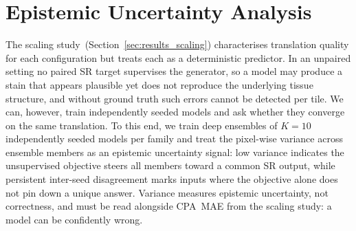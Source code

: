 
\section{Epistemic Uncertainty Analysis}
\label{sec:uncertainty}

The scaling study~(Section~\ref{sec:results_scaling}) characterises translation quality
for each configuration but treats each as a deterministic predictor.
In an unpaired setting no paired SR target supervises the generator, so a model may
produce a stain that appears plausible yet does not reproduce the underlying tissue
structure, and without ground truth such errors cannot be detected per tile.
We can, however, train independently seeded models and ask whether they converge on the
same translation.
To this end, we train deep ensembles of $K{=}10$ independently seeded models per family
and treat the pixel-wise variance across ensemble members as an epistemic uncertainty
signal: low variance indicates the unsupervised objective steers all members toward a
common SR output, while persistent inter-seed disagreement marks inputs where the
objective alone does not pin down a unique answer.
Variance measures epistemic uncertainty, not correctness, and must be read alongside
CPA~MAE from the scaling study: a model can be confidently wrong.

